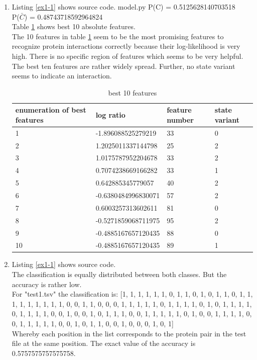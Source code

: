 \documentclass[10pt,a4paper]{article}
\begin{document}
\begin{enumerate}
\item Listing \ref{ex1-1} shows source code.
 {model.py}
P(C) = 0.5125628140703518\\
P($\bar{C}$) = 0.48743718592964824\\
Table \ref{tab1} shows best 10 absolute features.\\
The 10 features in table \ref{tab1} seem to be the most promising features to recognize protein interactions correctly because their log-likelihood is very high. There is no specific region of features which seems to be very helpful. The best ten features are rather widely spread. Further, no state variant seems to indicate an interaction.
\begin{table}[b]
\label{tab1}
\begin{tabular}{llll}
enumeration of best features & log ratio & feature number & state variant\\
\hline
1 & -1.896088525279219 & 33 & 0\\
2 & 1.2025011337144798 & 25 & 2\\
3 & 1.0175787952204678 & 33 & 2\\
4 & 0.7074238669166282 & 33 & 1\\
5 & 0.642885345779057 & 40 & 2\\
6 & -0.6380484996830071 & 57 & 2\\
7 & 0.6003257313602611 & 81 & 0\\
8 & -0.5271859068711975 & 95 & 2\\
9 & -0.4885167657120435 & 88 & 0\\
10 & -0.4885167657120435 & 89 & 1\\
\end{tabular}
\caption{best 10 features}
\end{table}

\item Listing \ref{ex1-1} shows source code.\\
The classification is equally distributed between both classes. But the accuracy is rather low.\\
For "test1.tsv" the classification is: [1, 1, 1, 1, 1, 1, 0, 1, 1, 0, 1, 0, 1, 1, 0, 1, 1, 1, 1, 1, 1, 1, 1, 1, 0, 0, 1, 1, 0, 0, 0, 1, 1, 1, 1, 1, 0, 1, 1, 1, 1, 0, 1, 0, 1, 1, 1, 1, 0, 1, 1, 1, 1, 0, 0, 1, 0, 0, 1, 0, 1, 1, 1, 0, 0, 1, 1, 1, 1, 1, 0, 1, 0, 0, 1, 1, 1, 1, 0, 0, 1, 1, 1, 1, 1, 0, 0, 1, 0, 1, 1, 0, 0, 1, 0, 0, 0, 1, 0, 1]\\
Whereby each position in the list corresponds to the protein pair in the test file at the same position. The exact value of the accuracy is 0.5757575757575758.


\end{enumerate}
\end{document}
